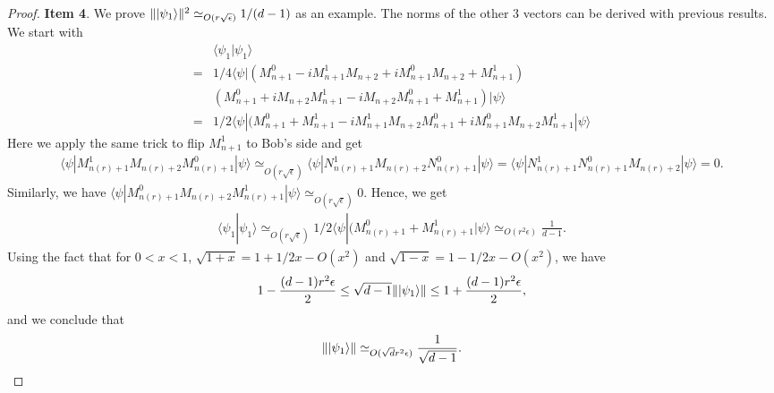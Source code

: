 \documentclass[11pt,letterpaper]{article}
\newcommand{\ket}[1]{|#1\rangle}
\newcommand{\bra}[1]{\langle#1|}
\newcommand{\braket}[2]{\langle#1|#2\rangle}
\DeclarePairedDelimiter{\norm}{\lVert}{\rVert}
\newcommand{\1}{\mathbb{1}}
\newcommand{\nr}{n(r)}
\newcommand{\ep}{\epsilon}
\newcommand{\se}{\sqrt{\epsilon}}
\newcommand{\sd}{\sqrt{d}}
\newcommand{\appd}[1]{\simeq_{#1}}
\theoremstyle{definition}
\begin{document}
\begin{proof}
	\textbf{Item 4}. We prove $\norm{\ket{\psi_1}}^2 \appd{O(r \se)} 1/(d-1)$ as an example. 
	The norms of the other $3$ vectors can be derived with previous results.
	We start with
	\begin{align*}
		&\braket{\psi_1}{\psi_1} \\
		=&1/4\bra{\psi}(M_{n+1}^0 - iM_{n+1}^1M_{n+2} + iM_{n+1}^0M_{n+2} +M_{n+1}^1)\\
		&(M_{n+1}^0 + iM_{n+2}M_{n+1}^1 -iM_{n+2}M_{n+1}^0 + M_{n+1}^1)\ket{\psi}\\
		=&1/2\bra{\psi}(M_{n+1}^0+M_{n+1}^1-iM_{n+1}^1M_{n+2}M_{n+1}^0+iM_{n+1}^0M_{n+2}M_{n+1}^1\ket{\psi}
	\end{align*}
	Here we apply the same trick to flip $M_{n+1}^1$ to Bob's side and get 
	\begin{align}
		\bra{\psi}M_{\nr+1}^1M_{\nr+2}M_{\nr+1}^0\ket{\psi} \appd{O(r\se)} \bra{\psi}N_{\nr+1}^1M_{\nr+2}N_{\nr+1}^0\ket{\psi} 
		= \bra{\psi}N_{\nr+1}^1N_{\nr+1}^0M_{\nr+2}\ket{\psi} = 0.
	\end{align}
	Similarly, we have $\bra{\psi}M_{\nr+1}^0M_{\nr+2}M_{\nr+1}^1\ket{\psi} \appd{ O(r\se)} 0$.
	Hence, we get 
	\begin{align}
		\braket{\psi_1}{\psi_1} \appd{O(r\se)} 1/2\bra{\psi}(M_{\nr+1}^0+M_{\nr+1}^1\ket{\psi} \appd{O(r^2\ep)} 
		 \frac{1}{d-1}.
	\end{align}
	Using the fact that for $0 < x < 1$, $\sqrt{1+x} = 1 + 1/2 x - O(x^2)$ and $\sqrt{1-x} = 1- 1/2x - O(x^2)$,
	we have
	\begin{align}
		1-\frac{(d-1)r^2 \ep}{2} \leq \sqrt{d-1} \norm{\ket{\psi_1}} \leq 1 + \frac{(d-1)r^2 \ep}{2},
	\end{align}
	and we conclude that 
	\begin{align}
		\norm{\ket{\psi_1}} \appd{O(\sd r^2 \ep)} \frac{1}{\sqrt{d-1}}.
	\end{align}	
	

\end{proof}
\end{document}
